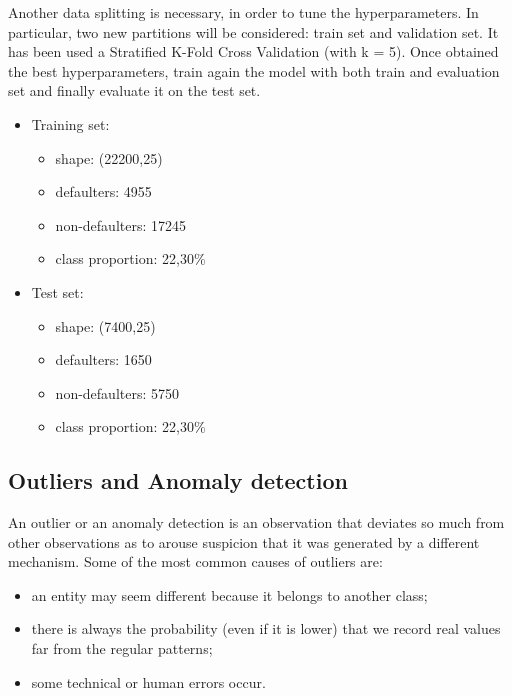 \documentclass{article}
\begin{document}
Another data splitting is necessary, in order to tune the hyperparameters. In particular, two new partitions will be considered: train set and validation set. It has been used a Stratified K-Fold Cross Validation (with k = 5). Once obtained the best hyperparameters, train again the model with both train and evaluation set and finally evaluate it on the test set.

\begin{itemize}
    \item Training set:
    \begin{itemize}
        \item shape: (22200,25)
        \item defaulters: 4955
        \item non-defaulters: 17245
        \item class proportion: 22,30\%
    \end{itemize}
    \item Test set:
     \begin{itemize}
        \item shape: (7400,25)
        \item defaulters: 1650
        \item non-defaulters: 5750
        \item class proportion: 22,30\%
    \end{itemize}
\end{itemize}

\subsection{Outliers and Anomaly detection}
An outlier or an anomaly detection is an observation that deviates so much from other observations as to arouse suspicion that it was generated by a different mechanism. Some of the most common causes of outliers are:
\begin{itemize}
    \item an entity may seem different because it belongs to another class;
    \item  there is always the probability (even if it is lower) that we record real values far from the regular patterns;
    \item some technical or human errors occur.
\end{itemize}
\end{document}
